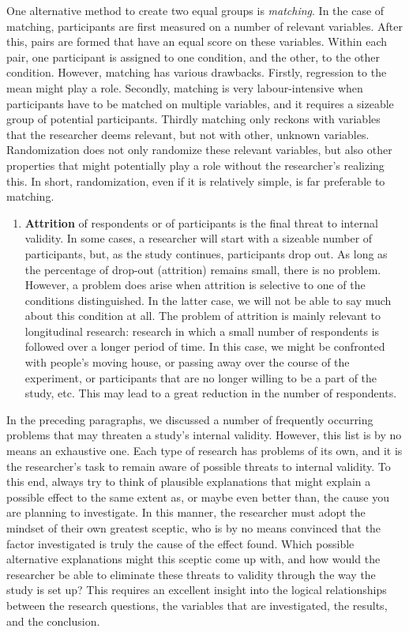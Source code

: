 \documentclass[
]{book}
\providecommand{\tightlist}{%
  \setlength{\itemsep}{0pt}\setlength{\parskip}{0pt}}
\begin{document}
One alternative method to create two equal groups is \emph{matching}. In the case of matching, participants are first measured on a number of relevant variables. After this, pairs are formed that have an equal score on these variables. Within each pair, one participant is assigned to one condition, and the other, to the other condition. However, matching has various drawbacks. Firstly, regression to the mean might play a role. Secondly, matching is very labour-intensive when participants have to be matched on multiple variables, and it requires a sizeable group of potential participants. Thirdly matching only reckons with variables that the researcher deems relevant, but not with other, unknown variables. Randomization does not only randomize these relevant variables, but also other properties that might potentially play a role without the researcher's realizing this. In short, randomization, even if it is relatively simple, is far preferable to matching.

\begin{enumerate}
\def\labelenumi{\arabic{enumi}.}
\setcounter{enumi}{5}
\tightlist
\item
  \textbf{Attrition} of respondents or of participants is the final threat to internal validity. In some cases, a researcher will start with a sizeable number of participants, but, as the study continues, participants drop out. As long as the percentage of drop-out (attrition) remains small, there is no problem. However, a problem does arise when attrition is selective to one of the conditions distinguished. In the latter case, we will not be able to say much about this condition at all. The problem of attrition is mainly relevant to longitudinal research: research in which a small number of respondents is followed over a longer period of time. In this case, we might be confronted with people's moving house, or passing away over the course of the experiment, or participants that are no longer willing to be a part of the study, etc. This may lead to a great reduction in the number of respondents.
\end{enumerate}

In the preceding paragraphs, we discussed a number of frequently occurring problems that may threaten a study's internal validity. However, this list is by no means an exhaustive one. Each type of research has problems of its own, and it is the researcher's task to remain aware of possible threats to internal validity. To this end, always try to think of plausible explanations that might explain a possible effect to the same extent as, or maybe even better than, the cause you are planning to investigate. In this manner, the researcher must adopt the mindset of their own greatest sceptic, who is by no means convinced that the factor investigated is truly the cause of the effect found. Which possible alternative explanations might this sceptic come up with, and how would the researcher be able to eliminate these threats to validity through the way the study is set up? This requires an excellent insight into the logical relationships between the research questions, the variables that are investigated, the results, and the conclusion.
\end{document}
